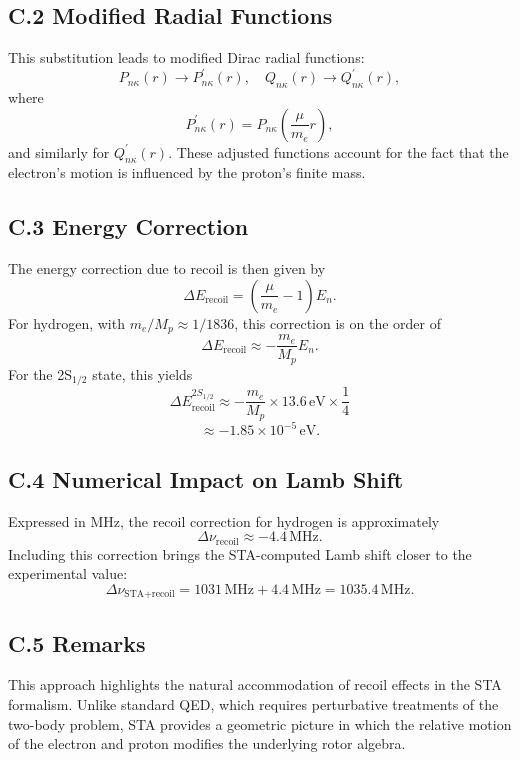 \documentclass[12pt]{article}
\begin{document}
\subsection*{C.2 Modified Radial Functions}

This substitution leads to modified Dirac radial functions:
\[
P_{n\kappa}(r) \to P_{n\kappa}^\prime(r), \quad
Q_{n\kappa}(r) \to Q_{n\kappa}^\prime(r),
\]
where
\[
P_{n\kappa}^\prime(r) = P_{n\kappa}\left(\frac{\mu}{m_e}r\right),
\]
and similarly for \(Q_{n\kappa}^\prime(r)\). These adjusted functions account for the fact that the electron’s motion is influenced by the proton’s finite mass.

\subsection*{C.3 Energy Correction}

The energy correction due to recoil is then given by
\[
\Delta E_\text{recoil} = \left(\frac{\mu}{m_e} - 1\right) E_n.
\]
For hydrogen, with \(m_e/M_p \approx 1/1836\), this correction is on the order of
\[
\Delta E_\text{recoil} \approx -\frac{m_e}{M_p} E_n.
\]
For the 2S\(_{1/2}\) state, this yields
\[
\Delta E_\text{recoil}^{2S_{1/2}} \approx -\frac{m_e}{M_p} \times 13.6\,\text{eV} \times \frac{1}{4}
\]
\[
\approx -1.85 \times 10^{-5}\,\text{eV}.
\]

\subsection*{C.4 Numerical Impact on Lamb Shift}

Expressed in MHz, the recoil correction for hydrogen is approximately
\[
\Delta\nu_\text{recoil} \approx -4.4\,\text{MHz}.
\]
Including this correction brings the STA-computed Lamb shift closer to the experimental value:
\[
\Delta\nu_\text{STA+recoil} = 1031\,\text{MHz} + 4.4\,\text{MHz} = 1035.4\,\text{MHz}.
\]

\subsection*{C.5 Remarks}

This approach highlights the natural accommodation of recoil effects in the STA formalism. Unlike standard QED, which requires perturbative treatments of the two-body problem, STA provides a geometric picture in which the relative motion of the electron and proton modifies the underlying rotor algebra.

\appendix
\end{document}
